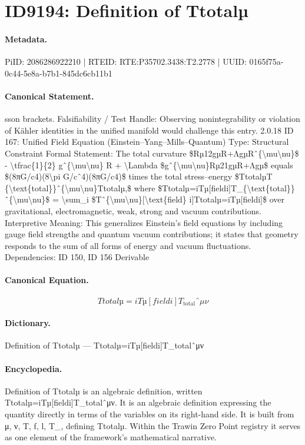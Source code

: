 \section*{ID9194: Definition of Ttotalµ}
\paragraph{Metadata.}
PiID: 2086286922210 | RTEID: RTE:P35702.3438:T2.2778 | UUID: 0165f75a-0c44-5e8a-b7b1-845dc6cb11b1

\paragraph{Canonical Statement.}
sson brackets. Falsifiability / Test Handle: Observing nonintegrability or violation of Kähler identities in the unified manifold would challenge this entry. 2.0.18 ID 167: Unified Field Equation (Einstein–Yang–Mills–Quantum) Type: Structural Constraint Formal Statement: The total curvature \$Rµ12gµR+ΛgµRˆ\{\textbackslash{}mu\textbackslash{}nu\}\$ - \textbackslash{}tfrac\{1\}\{2\} gˆ\{\textbackslash{}mu\textbackslash{}nu\} R + \textbackslash{}Lambda \$gˆ\{\textbackslash{}mu\textbackslash{}nu\}Rµ21gµR+Λgµ\$ equals \$(8πG/c4)(8\textbackslash{}pi G/cˆ4)(8πG/c4)\$ times the total stress–energy \$TtotalµT \{\textbackslash{}text\{total\}\}ˆ\{\textbackslash{}mu\textbackslash{}nu\}Ttotalµ,\$ where \$Ttotalµ=iTµ[fieldi]T\_\{\textbackslash{}text\{total\}\}ˆ\{\textbackslash{}mu\textbackslash{}nu\}\$ = \textbackslash{}sum\_i \$Tˆ\{\textbackslash{}mu\textbackslash{}nu\}[\textbackslash{}text\{field\} i]Ttotalµ=iTµ[fieldi]\$ over gravitational, electromagnetic, weak, strong and vacuum contributions. Interpretive Meaning: This generalizes Einstein’s field equations by including gauge field strengths and quantum vacuum contributions; it states that geometry responds to the sum of all forms of energy and vacuum fluctuations. Dependencies: ID 150, ID 156 Derivable

\paragraph{Canonical Equation.}
\[
Ttotalµ=iTµ[fieldi]T_{\text{total}}ˆ{\mu\nu}
\]

\paragraph{Dictionary.}
Definition of Ttotalµ — Ttotalµ=iTµ[fieldi]T\_totalˆμν

\paragraph{Encyclopedia.}
Definition of Ttotalµ is an algebraic definition, written Ttotalµ=iTµ[fieldi]T\_totalˆμν. It is an algebraic definition expressing the quantity directly in terms of the variables on its right-hand side. It is built from μ, ν, T, f, l, T\_, defining Ttotalµ. Within the Trawin Zero Point registry it serves as one element of the framework's mathematical narrative.
